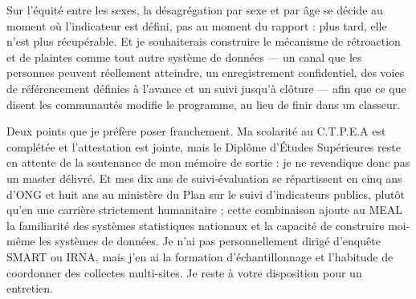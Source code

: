 \documentclass[10pt,a4paper,sans]{moderncv}
\begin{document}
Sur l'équité entre les sexes, la désagrégation par sexe et par âge se décide au moment où l'indicateur est défini, pas au moment du rapport : plus tard, elle n'est plus récupérable. Et je souhaiterais construire le mécanisme de rétroaction et de plaintes comme tout autre système de données --- un canal que les personnes peuvent réellement atteindre, un enregistrement confidentiel, des voies de référencement définies à l'avance et un suivi jusqu'à clôture --- afin que ce que disent les communautés modifie le programme, au lieu de finir dans un classeur.

Deux points que je préfère poser franchement. Ma scolarité au C.T.P.E.A est complétée et l'attestation est jointe, mais le Diplôme d'Études Supérieures reste en attente de la soutenance de mon mémoire de sortie : je ne revendique donc pas un master délivré. Et mes dix ans de suivi-évaluation se répartissent en cinq ans d'ONG et huit ans au ministère du Plan sur le suivi d'indicateurs publics, plutôt qu'en une carrière strictement humanitaire ; cette combinaison ajoute au MEAL la familiarité des systèmes statistiques nationaux et la capacité de construire moi-même les systèmes de données. Je n'ai pas personnellement dirigé d'enquête SMART ou IRNA, mais j'en ai la formation d'échantillonnage et l'habitude de coordonner des collectes multi-sites. Je reste à votre disposition pour un entretien.

\makeletterclosing
\end{document}
